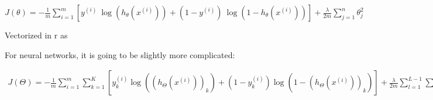 \documentclass[
]{article}
\newenvironment{Shaded}{\begin{snugshade}}{\end{snugshade}}
\newcommand{\DecValTok}[1]{\textcolor[rgb]{0.00,0.00,0.81}{#1}}
\newcommand{\KeywordTok}[1]{\textcolor[rgb]{0.13,0.29,0.53}{\textbf{#1}}}
\newcommand{\NormalTok}[1]{#1}
\newcommand{\OperatorTok}[1]{\textcolor[rgb]{0.81,0.36,0.00}{\textbf{#1}}}
\newcommand{\StringTok}[1]{\textcolor[rgb]{0.31,0.60,0.02}{#1}}
\begin{document}
\(J(\theta) = - \frac{1}{m} \sum_{i=1}^m [ y^{(i)}\ \log (h_\theta (x^{(i)})) + (1 - y^{(i)})\ \log (1 - h_\theta(x^{(i)}))] + \frac{\lambda}{2m}\sum_{j=1}^n \theta_j^2\)

Vectorized in r as

\begin{Shaded}
\end{Shaded}

For neural networks, it is going to be slightly more complicated:

\(\begin{gather*} J(\Theta) = - \frac{1}{m} \sum_{i=1}^m \sum_{k=1}^K \left[y^{(i)}_k \log ((h_\Theta (x^{(i)}))_k) + (1 - y^{(i)}_k)\log (1 - (h_\Theta(x^{(i)}))_k)\right] + \frac{\lambda}{2m}\sum_{l=1}^{L-1} \sum_{i=1}^{s_l} \sum_{j=1}^{s_{l+1}} ( \Theta_{j,i}^{(l)})^2\end{gather*}\)
\end{document}
